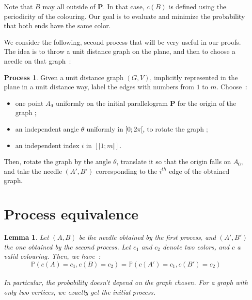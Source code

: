 \documentclass[a4paper,11pt]{article}
\newtheorem{lemma}{Lemma}
\theoremstyle{definition}
\newtheorem{process}{Process}
\theoremstyle{remark}
\begin{document}
Note that $B$ may all outside of $\mathbf{P}$. In that case, $c(B)$ is 
defined using the periodicity of the colouring.
Our goal is to evaluate and minimize the probability that both ends have the 
same color.

We consider the following, second process that will be very useful in our 
proofs. The idea is to throw a unit distance graph on the 
plane, and then to choose a needle on that graph~:
\begin{process}
Given a unit distance graph $(G,V)$, implicitly represented in the plane in 
a unit distance way, label the edges with numbers from 
$1$ to $m$. Choose~: 
\begin{itemize}
\item one point $A_0$ uniformly on the initial parallelogram $\mathbf{P}$ for 
the origin of the graph ;
\item an independent angle $\theta$ uniformly in $[0;2\pi[$, to rotate the graph ;
\item an independent index $i$ in $[| 1;m|]$.
\end{itemize}
Then, rotate the graph by the angle $\theta$, translate it so that the origin 
falls on  $A_0$, and take the needle $(A',B')$ corresponding to the $i^{th}$ 
edge of the obtained graph.
\end{process}

\section{Process equivalence}
\label{equiv}
\begin{lemma}\label{huitre}
Let $(A,B)$ be the needle obtained by the first process, and
$(A',B')$ the one obtained by the second process. Let $c_1$ and $c_2$ denote 
two colors, and $c$ a valid colouring. Then, we 
have~:\\
 $$\mathbb{P}(c(A) = c_1, c(B) = c_2) = \mathbb{P}(c(A') = c_1, c(B') = c_2) $$ \\
 In particular, the probability doesn't depend on the graph 
 chosen. For a graph with only two vertices, we exactly get the initial process.
\end{lemma}
\end{document}
